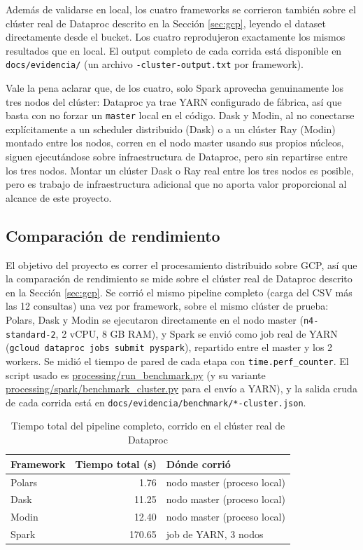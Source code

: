 Además de validarse en local, los cuatro frameworks se corrieron también sobre el clúster real de Dataproc descrito en la Sección \ref{sec:gcp}, leyendo el dataset directamente desde el bucket. Los cuatro reprodujeron exactamente los mismos resultados que en local. El output completo de cada corrida está disponible en \texttt{docs/evidencia/} (un archivo \texttt{-cluster-output.txt} por framework).

Vale la pena aclarar que, de los cuatro, solo Spark aprovecha genuinamente los tres nodos del clúster: Dataproc ya trae YARN configurado de fábrica, así que basta con no forzar un \texttt{master} local en el código. Dask y Modin, al no conectarse explícitamente a un scheduler distribuido (Dask) o a un clúster Ray (Modin) montado entre los nodos, corren en el nodo master usando sus propios núcleos, siguen ejecutándose sobre infraestructura de Dataproc, pero sin repartirse entre los tres nodos. Montar un clúster Dask o Ray real entre los tres nodos es posible, pero es trabajo de infraestructura adicional que no aporta valor proporcional al alcance de este proyecto.

\subsection{Comparación de rendimiento}
\label{sec:benchmark}

El objetivo del proyecto es correr el procesamiento distribuido sobre GCP, así que la comparación de rendimiento se mide sobre el clúster real de Dataproc descrito en la Sección \ref{sec:gcp}. Se corrió el mismo pipeline completo (carga del CSV más las 12 consultas) una vez por framework, sobre el mismo clúster de prueba: Polars, Dask y Modin se ejecutaron directamente en el nodo master (\texttt{n4-standard-2}, 2 vCPU, 8 GB RAM), y Spark se envió como job real de YARN (\texttt{gcloud dataproc jobs submit pyspark}), repartido entre el master y los 2 workers. Se midió el tiempo de pared de cada etapa con \texttt{time.perf\_counter}. El script usado es \url{processing/run_benchmark.py} (y su variante \url{processing/spark/benchmark_cluster.py} para el envío a YARN), y la salida cruda de cada corrida está en \texttt{docs/evidencia/benchmark/*-cluster.json}.

\begin{table}[H]
\centering
\begin{tabular}{lrl}
\toprule
\textbf{Framework} & \textbf{Tiempo total (s)} & \textbf{Dónde corrió} \\
\midrule
Polars & 1.76 & nodo master (proceso local) \\
Dask & 11.25 & nodo master (proceso local) \\
Modin & 12.40 & nodo master (proceso local) \\
Spark & 170.65 & job de YARN, 3 nodos \\
\bottomrule
\end{tabular}
\caption{Tiempo total del pipeline completo, corrido en el clúster real de Dataproc}
\label{tab:benchmark-cluster}
\end{table}

